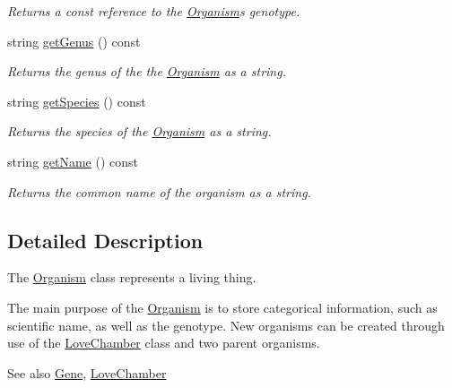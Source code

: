 \begin{DoxyCompactItemize}
\begin{DoxyCompactList}\small\item\em Returns a const reference to the \hyperlink{class_organism}{Organism}\textquotesingle{}s genotype. \end{DoxyCompactList}\item 
\hypertarget{class_organism_a7e6b427ff537967ae93bf1ee3a4adbfe}{}string \hyperlink{class_organism_a7e6b427ff537967ae93bf1ee3a4adbfe}{get\+Genus} () const \label{class_organism_a7e6b427ff537967ae93bf1ee3a4adbfe}

\begin{DoxyCompactList}\small\item\em Returns the genus of the the \hyperlink{class_organism}{Organism} as a string. \end{DoxyCompactList}\item 
\hypertarget{class_organism_a7d7d392b253bfacf2e13855de9b7312a}{}string \hyperlink{class_organism_a7d7d392b253bfacf2e13855de9b7312a}{get\+Species} () const \label{class_organism_a7d7d392b253bfacf2e13855de9b7312a}

\begin{DoxyCompactList}\small\item\em Returns the species of the \hyperlink{class_organism}{Organism} as a string. \end{DoxyCompactList}\item 
\hypertarget{class_organism_a3b539756747214049f9912a55cb7e483}{}string \hyperlink{class_organism_a3b539756747214049f9912a55cb7e483}{get\+Name} () const \label{class_organism_a3b539756747214049f9912a55cb7e483}

\begin{DoxyCompactList}\small\item\em Returns the common name of the organism as a string. \end{DoxyCompactList}\end{DoxyCompactItemize}


\subsection{Detailed Description}
The \hyperlink{class_organism}{Organism} class represents a living thing. 

The main purpose of the \hyperlink{class_organism}{Organism} is to store categorical information, such as scientific name, as well as the genotype. New organisms can be created through use of the \hyperlink{class_love_chamber}{Love\+Chamber} class and two parent organisms. \begin{DoxySeeAlso}{See also}
\hyperlink{class_gene}{Gene}, \hyperlink{class_love_chamber}{Love\+Chamber} 
\end{DoxySeeAlso}


